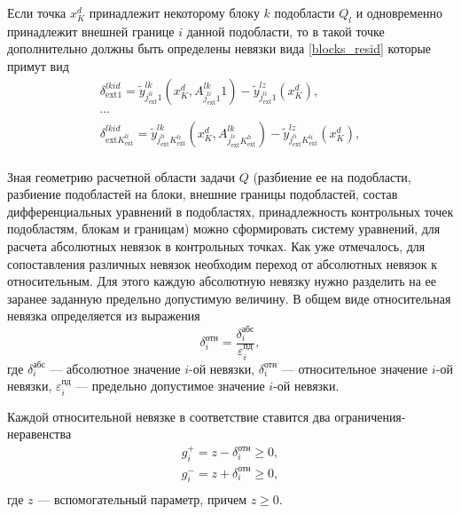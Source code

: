 \documentclass[a4paper,12pt]{article}
\begin{document}
Если точка $x^d_K$ принадлежит некоторому блоку $k$ подобласти $Q_l$ и
одновременно принадлежит внешней границе $i$ данной подобласти, то в
такой точке дополнительно должны быть определены невязки вида
\eqref{blocks_resid} которые примут вид
\begin{equation}
    \begin{array}{cc}
        \delta^{lkid}_{\text{ext} 1} = 
        \tilde{y}^{lk}_{j^{li}_{\text{ext} }1}
            (x^d_K, A^{lk}_{j^{li}_{\text{ext} }1}1)
        - \tilde{y}^{lz}_{j^{li}_{\text{ext} }1}
            (x^d_K),\\
        \cdots \\
        \delta^{lkid}_{\text{ext} K^{li}_{\text{ext}}} = 
        \tilde{y}^{lk}_{j^{li}_{\text{ext} }K^{li}_{\text{ext}}}
            (x^d_K, A^{lk}_{j^{li}_{\text{ext} }K^{li}_{\text{ext}}})
        - \tilde{y}^{lz}_{j^{li}_{\text{ext} }K^{li}_{\text{ext}}}
            (x^d_K),\\
    \end{array}
    \label{cp_blocks_resid}
\end{equation}

Зная геометрию расчетной области задачи $Q$ (разбиение ее на
подобласти, разбиение подобластей на блоки, внешние границы
подобластей, состав дифференциальных уравнений в подобластях,
принадлежность контрольных точек подобластям, блокам и границам) можно
сформировать систему уравнений, для расчета абсолютных невязок в
контрольных точках. Как уже отмечалось, для сопоставления различных
невязок необходим переход от абсолютных невязок к относительным. Для
этого каждую абсолютную невязку нужно разделить на ее заранее заданную
предельно допустимую величину. В общем виде относительная невязка
определяется из выражения
\begin{equation}
    \delta^{\text{отн}}_i =
        \frac{\delta^{\text{абс}}_i}
        {\varepsilon^{\text{пд}}_i},
\end{equation}
где $\delta^{\text{абс}}_i$ --- абсолютное значение $i$-ой невязки, 
$\delta^{\text{отн}}_i$ --- относительное значение $i$-ой невязки,
$\varepsilon^{\text{пд}}_i$ --- предельно допустимое значение $i$-ой
невязки.

Каждой относительной невязке в соответствие ставится два
ограничения-неравенства
\begin{equation}
    \begin{array}{ll}
        g^{+}_i = z - \delta^{\text{отн}}_i \ge 0,\\
        g^{-}_i = z + \delta^{\text{отн}}_i \ge 0,\\
    \end{array}
    \label{lcnstr}
\end{equation}
где $z$ --- вспомогательный параметр, причем $z \ge 0$.
\end{document}
